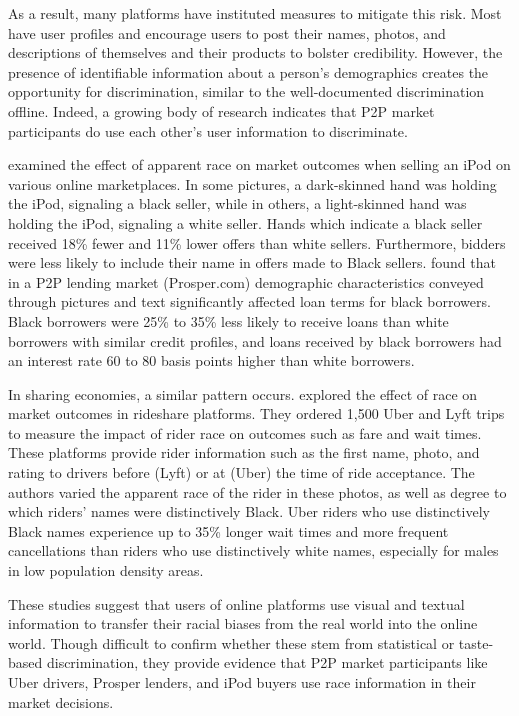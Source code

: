 As a result, many platforms have instituted measures to mitigate this risk. Most have user profiles and encourage users to post their names, photos, and descriptions of themselves and their products to bolster credibility. However, the presence of identifiable information about a person’s demographics creates the opportunity for discrimination, similar to the well-documented discrimination offline. Indeed, a growing body of research indicates that P2P market participants do use each other’s user information to discriminate.

\cite{doleac} examined the effect of apparent race on market outcomes when selling an iPod on various online marketplaces. In some pictures, a dark-skinned hand was holding the iPod, signaling a black seller, while in others, a light-skinned hand was holding the iPod, signaling a white seller. Hands which indicate a black seller received 18\% fewer and 11\% lower offers than white sellers. Furthermore, bidders were less likely to include their name in offers made to Black sellers. \cite{SYDNOR CITATION} found that in a P2P lending market (Prosper.com) demographic characteristics conveyed through pictures and text significantly affected loan terms for black borrowers. Black borrowers were 25\% to 35\% less likely to receive loans than white borrowers with similar credit profiles, and loans received by black borrowers had an interest rate 60 to 80 basis points higher than white borrowers.

In sharing economies, a similar pattern occurs. \cite{knittel} explored the effect of race on market outcomes in rideshare platforms. They ordered 1,500 Uber and Lyft trips to measure the impact of rider race on outcomes such as fare and wait times. These platforms provide rider information such as the first name, photo, and rating to drivers before (Lyft) or at (Uber) the time of ride acceptance. The authors varied the apparent race of the rider in these photos, as well as degree to which riders’ names were distinctively Black. Uber riders who use distinctively Black names experience up to 35\% longer wait times and more frequent cancellations than riders who use distinctively white names, especially for males in low population density areas.

These studies suggest that users of online platforms use visual and textual information to transfer their racial biases from the real world into the online world. Though difficult to confirm whether these stem from statistical or taste-based discrimination, they provide evidence that P2P market participants like Uber drivers, Prosper lenders, and iPod buyers use race information in their market decisions. 


